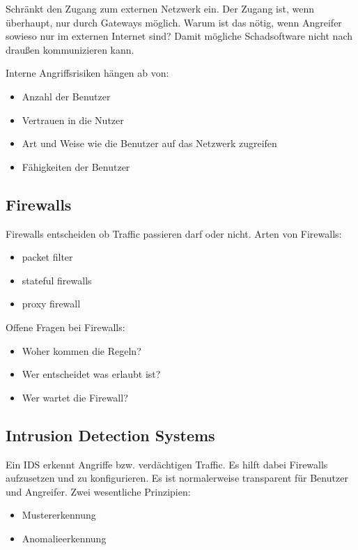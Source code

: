 Schränkt den Zugang zum externen Netzwerk ein.
Der Zugang ist, wenn überhaupt, nur durch Gateways möglich.
Warum ist das nötig, wenn Angreifer sowieso nur im externen Internet sind?
Damit mögliche Schadsoftware nicht nach draußen kommunizieren kann.

Interne Angriffsrisiken hängen ab von:
\begin{itemize}
  \item Anzahl der Benutzer
  \item Vertrauen in die Nutzer
  \item Art und Weise wie die Benutzer auf das Netzwerk zugreifen
  \item Fähigkeiten der Benutzer
\end{itemize}

\subsection{Firewalls}%
\label{sub:firewalls}

Firewalls entscheiden ob Traffic passieren darf oder nicht.
Arten von Firewalls:
\begin{itemize}
  \item packet filter
  \item stateful firewalls
  \item proxy firewall
\end{itemize}

Offene Fragen bei Firewalls:
\begin{itemize}
  \item Woher kommen die Regeln?
  \item Wer entscheidet was erlaubt ist?
  \item Wer wartet die Firewall?
\end{itemize}

\subsection{Intrusion Detection Systems}%
\label{sub:intrusion_detection_systems}

Ein IDS erkennt Angriffe bzw. verdächtigen Traffic.
Es hilft dabei Firewalls aufzusetzen und zu konfigurieren.
Es ist normalerweise transparent für Benutzer und Angreifer.
Zwei wesentliche Prinzipien:
\begin{itemize}
  \item Mustererkennung
  \item Anomalieerkennung
\end{itemize}

